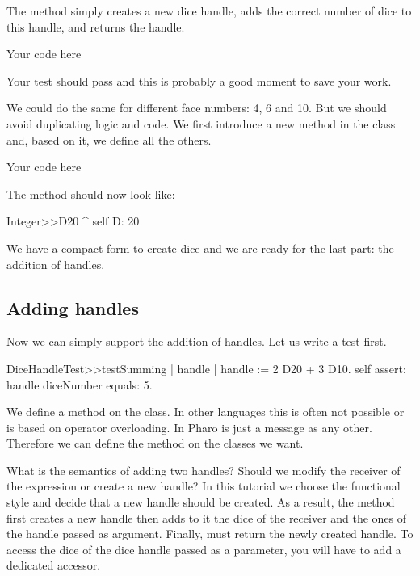 \documentclass[a4paper,10pt,twoside]{book}
\begin{document}
The method  simply creates a new dice handle, adds the correct number of dice to this handle, and returns the handle.


\begin{code}{}
Your code here
\end{code}


Your test should pass and this is probably a good moment to save your work.

We could do the same for  different face numbers: 4, 6 and 10. But we should avoid duplicating logic and code. We first introduce a new method  in the  class and, based on it, we define all the others.


\begin{code}{}
Your code here
\end{code}


The  method should now look like:


\begin{code}{}
Integer>>D20
    ^ self D: 20
\end{code}


We have a compact form to create dice and we are ready for the last part: the addition of handles.
\subsection{ Adding handles}
Now we can simply support the addition of handles. Let us write a test first.


\begin{code}{}
DiceHandleTest>>testSumming
    | handle |
    handle := 2 D20 + 3 D10.
    self assert: handle diceNumber equals: 5.
\end{code}


We define a \ct{+} method on the  class. In other languages this is often not possible or is based on operator overloading. In Pharo \ct{+} is just a message as any other. Therefore we can define the \ct{+} method on the classes we want.

What is the semantics of adding two handles? Should we modify the receiver of the expression or create a new handle? In this tutorial we choose the functional style and decide that a new handle should be created. As a result, the method \ct{+} first creates a new handle then adds to it the dice of the receiver and the ones of the handle passed as argument. Finally, \ct{+} must return the newly created handle. To access the dice of the dice handle passed as a parameter, you will have to add a dedicated accessor.
\end{document}
